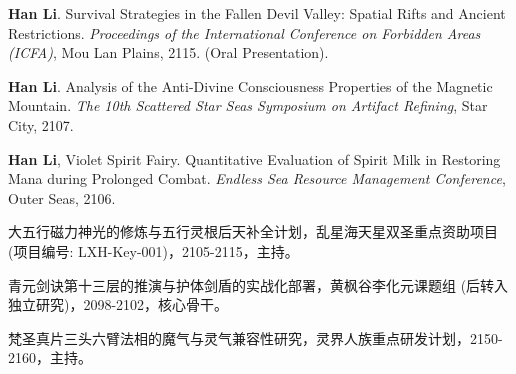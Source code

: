 \begin{achievements}
\begin{theachievements}[国际会议论文及报告]
    \item \textbf{Han Li}. Survival Strategies in the Fallen Devil Valley: Spatial Rifts and Ancient Restrictions. \textit{Proceedings of the International Conference on Forbidden Areas (ICFA)}, Mou Lan Plains, 2115. (Oral Presentation).
    \item \textbf{Han Li}. Analysis of the Anti-Divine Consciousness Properties of the Magnetic Mountain. \textit{The 10th Scattered Star Seas Symposium on Artifact Refining}, Star City, 2107.
    \item \textbf{Han Li}, Violet Spirit Fairy. Quantitative Evaluation of Spirit Milk in Restoring Mana during Prolonged Combat. \textit{Endless Sea Resource Management Conference}, Outer Seas, 2106.
\end{theachievements}

\begin{theachievements}[参与的科研项目]
    \item 大五行磁力神光的修炼与五行灵根后天补全计划，乱星海天星双圣重点资助项目 (项目编号: LXH-Key-001)，2105-2115，主持。
    \item 青元剑诀第十三层的推演与护体剑盾的实战化部署，黄枫谷李化元课题组 (后转入独立研究)，2098-2102，核心骨干。
    \item 梵圣真片三头六臂法相的魔气与灵气兼容性研究，灵界人族重点研发计划，2150-2160，主持。
\end{theachievements}

\end{achievements}
